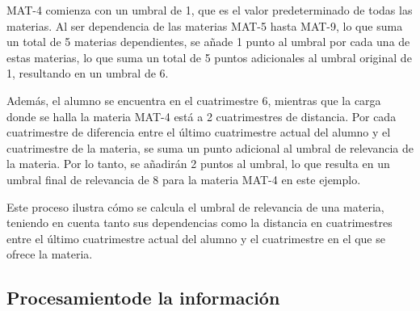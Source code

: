 MAT-4 comienza con un umbral de 1, que es el valor predeterminado de todas las materias. Al ser dependencia de las materias MAT-5 hasta MAT-9, lo que suma un total de 5 materias dependientes, se añade 1 punto al umbral por cada una de estas materias, lo que suma un total de 5 puntos adicionales al umbral original de 1, resultando en un umbral de 6.

Además, el alumno se encuentra en el cuatrimestre 6, mientras que la carga donde se halla la materia MAT-4 está a 2 cuatrimestres de distancia. Por cada cuatrimestre de diferencia entre el último cuatrimestre actual del alumno y el cuatrimestre de la materia, se suma un punto adicional al umbral de relevancia de la materia. Por lo tanto, se añadirán 2 puntos al umbral, lo que resulta en un umbral final de relevancia de 8 para la materia MAT-4 en este ejemplo.

Este proceso ilustra cómo se calcula el umbral de relevancia de una materia, teniendo en cuenta tanto sus dependencias como la distancia en cuatrimestres entre el último cuatrimestre actual del alumno y el cuatrimestre en el que se ofrece la materia.

\subsection{Procesamientode la información} \label{procesamiento_de_la_informacion}